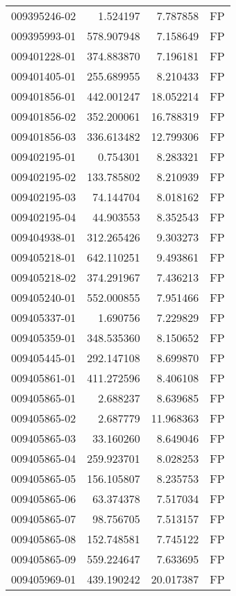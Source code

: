 \begin{tabular}{lrrl}
009395246-02 &    1.524197 &     7.787858 &   FP \\
009395993-01 &  578.907948 &     7.158649 &   FP \\
009401228-01 &  374.883870 &     7.196181 &   FP \\
009401405-01 &  255.689955 &     8.210433 &   FP \\
009401856-01 &  442.001247 &    18.052214 &   FP \\
009401856-02 &  352.200061 &    16.788319 &   FP \\
009401856-03 &  336.613482 &    12.799306 &   FP \\
009402195-01 &    0.754301 &     8.283321 &   FP \\
009402195-02 &  133.785802 &     8.210939 &   FP \\
009402195-03 &   74.144704 &     8.018162 &   FP \\
009402195-04 &   44.903553 &     8.352543 &   FP \\
009404938-01 &  312.265426 &     9.303273 &   FP \\
009405218-01 &  642.110251 &     9.493861 &   FP \\
009405218-02 &  374.291967 &     7.436213 &   FP \\
009405240-01 &  552.000855 &     7.951466 &   FP \\
009405337-01 &    1.690756 &     7.229829 &   FP \\
009405359-01 &  348.535360 &     8.150652 &   FP \\
009405445-01 &  292.147108 &     8.699870 &   FP \\
009405861-01 &  411.272596 &     8.406108 &   FP \\
009405865-01 &    2.688237 &     8.639685 &   FP \\
009405865-02 &    2.687779 &    11.968363 &   FP \\
009405865-03 &   33.160260 &     8.649046 &   FP \\
009405865-04 &  259.923701 &     8.028253 &   FP \\
009405865-05 &  156.105807 &     8.235753 &   FP \\
009405865-06 &   63.374378 &     7.517034 &   FP \\
009405865-07 &   98.756705 &     7.513157 &   FP \\
009405865-08 &  152.748581 &     7.745122 &   FP \\
009405865-09 &  559.224647 &     7.633695 &   FP \\
009405969-01 &  439.190242 &    20.017387 &   FP \\

\end{tabular}
